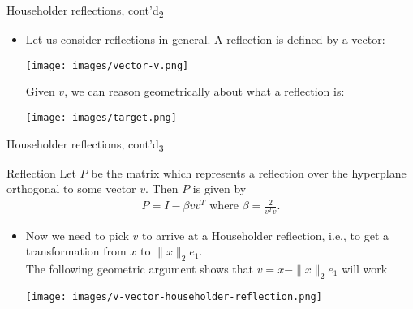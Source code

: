 \documentclass[t,usepdftitle=false]{beamer}
\begin{document}
\begin{frame}{Householder reflections, cont'd\textsubscript{2}}
\begin{itemize}
\item Let us consider reflections in general.
A reflection is defined by a vector:
\begin{center}
\vspace{.1cm}
\texttt{[image: images/vector-v.png]}
\end{center}
\vspace{.2cm}
Given $v$, we can reason geometrically about what a reflection is:\vspace{.2cm}
\begin{center}
\vspace{.1cm}
\texttt{[image: images/target.png]}
\end{center}
\end{itemize}
\end{frame}

\begin{frame}{Householder reflections, cont'd\textsubscript{3}}
\begin{block}{Reflection}
Let $P$ be the matrix which represents a reflection over the hyperplane orthogonal to some vector $v$.
Then $P$ is given by
\begin{align*}
P=I-\beta vv^T
\text{  where  }
\beta=\frac{2}{v^Tv}.
\end{align*}
\end{block}
\begin{itemize}
\item Now we need to pick $v$ to arrive at a Householder reflection, i.e., to get a transformation from $x$ to $\|x\|_2e_1$.\vspace{.1cm}\\
The following geometric argument shows that $v=x-\|x\|_2e_1$ will work
\begin{center}
\vspace{.1cm}
\texttt{[image: images/v-vector-householder-reflection.png]}
\end{center}
\end{itemize}
\end{frame}
\end{document}
